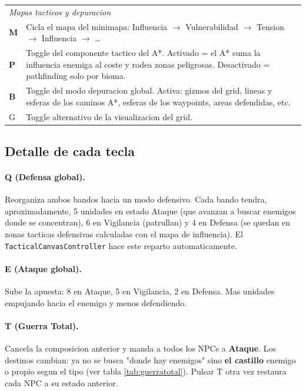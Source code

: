 \documentclass[12pt,a4paper]{article}
\begin{document}
\begin{table}[H]
\begin{tabularx}{\textwidth}{l X}
\midrule
\multicolumn{2}{l}{\textit{Mapas tacticos y depuracion}} \\
\textbf{M}        & Cicla el mapa del minimapa: Influencia $\to$ Vulnerabilidad $\to$ Tension $\to$ Influencia $\to$ \dots \\
\textbf{P}        & Toggle del componente tactico del A*. Activado = el A* suma la influencia enemiga al coste y rodea zonas peligrosas. Desactivado = pathfinding solo por bioma. \\
\textbf{B}        & Toggle del modo depuracion global. Activa: gizmos del grid, lineas y esferas de los caminos A*, esferas de los waypoints, areas defendidas, etc. \\
G                 & Toggle alternativo de la visualizacion del grid. \\
\bottomrule
\end{tabularx}
\end{table}

\subsection{Detalle de cada tecla}

\paragraph{Q (Defensa global).}
Reorganiza ambos bandos hacia un modo defensivo. Cada bando tendra,
aproximadamente, 5 unidades en estado Ataque (que avanzan a buscar
enemigos donde se concentran), 6 en Vigilancia (patrullan) y 4 en
Defensa (se quedan en zonas tacticas defensivas calculadas con el
mapa de influencia). El \texttt{TacticalCanvasController} hace este
reparto automaticamente.

\paragraph{E (Ataque global).}
Sube la apuesta: 8 en Ataque, 5 en Vigilancia, 2 en Defensa. Mas
unidades empujando hacia el enemigo y menos defendiendo.

\paragraph{T (Guerra Total).}
Cancela la composicion anterior y manda a todos los NPCs a
\textbf{Ataque}. Los destinos cambian: ya no se busca "donde hay
enemigos" sino \textbf{el castillo} enemigo o propio segun el tipo
(ver tabla \ref{tab:guerratotal}). Pulsar T otra vez restaura cada NPC
a su estado anterior.
\end{document}
